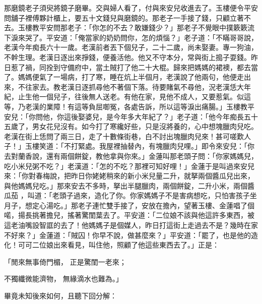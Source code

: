 \begin{showcontents}{}
那磨鏡老子須臾將鏡子磨畢。交與婦人看了，付與來安兒收進去了。玉樓便令平安問舖子裡傅夥計櫃上，要五十文錢兒與磨鏡的。那老子一手接了錢，只顧立著不去。玉樓教平安問那老子：「你怎的不去？敢嫌錢少？」那老子不覺眼中撲簌簌流下淚來哭了。平安道：「俺當家的奶奶問你，怎的煩惱？」老子道：「不瞞哥哥說，老漢今年痴長六十一歲。老漢前者丟下個兒子，二十二歲，尚未娶妻。專一狗油，不幹生理。老漢日逐出來掙錢，便養活他。他又不守本分，常與街上搗子耍錢。昨日惹了禍，同拴到守備府中，當土賊打了他二十大棍。歸來把媽媽的裙襖，都去當了。媽媽便氣了一場病，打了寒，睡在炕上半個月，老漢說了他兩句，他便走出來，不往家去。教老漢日逐抓尋他不著個下落。待要賭氣不尋他，況老漢恁大年紀，止生他一個兒子，往後無人送老。有他在家，見他不成人，又要惹氣。似這等，乃老漢的業障！有這等負屈啣冤，各處告訴，所以這等淚出痛腸。」玉樓教平安兒：「你問他，你這後娶婆兒，是今年多大年紀了？」老子道：「他今年痴長五十五歲了，男女花兒沒有。如今打了寒纔好些，只是沒將養的，心中想塊臘肉兒吃。老漢在街上恁問了兩三日，走了十數條街巷，白不討出塊臘肉兒來！甚可嗟歎人子！」玉樓笑道：「不打緊處。我屋裡抽替內，有塊臘肉兒哩。」即令來安兒：「你去對蘭香說，還有兩個餅錠，教他拿與你來。」金蓮叫那老頭子問：「你家媽媽兒，吃小米兒粥不吃？」老漢道：「怎的不吃？那裡可知好哩！」金蓮于是叫過來安兒來：「你對春梅說，把昨日你姥姥稍來的新小米兒量二升，就拏兩個醬瓜兒出來，與他媽媽兒吃。」那來安去不多時，拏出半腿臘肉，兩個餅錠，二升小米，兩個醬瓜茄 ，叫道：「老頭子過來，造化了你。你家媽媽子不是害病想吃，只怕害孩子坐月子，想定心湯吃。」那老子連忙雙手接了，安放在擔內，望著玉樓、金蓮唱了個喏，揚長挑著擔兒，搖著驚閨葉去了。平安道：「二位娘不該與他這許多東西，被這老油嘴設智誆的去了！他媽媽子是個媒人，昨日打這街上走過去不是？幾時在家不好來？」金蓮道：「賊囚！你早不說，做甚麼來？」平安道：「罷了，也是他的造化！可可二位娘出來看見，叫住他，照顧了他這些東西去了。」正是：

「閒來無事倚門楣，  正是驚閨一老來；

不獨纖微能濟物，  無緣滴水也難為。」

畢竟未知後來如何，且聽下回分解：




\end{showcontents}



